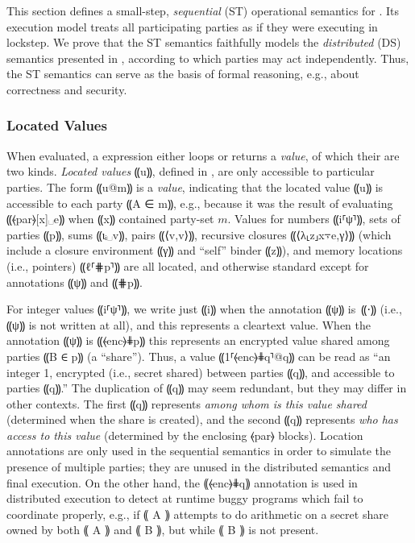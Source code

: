 This section defines a small-step, \emph{sequential} (ST)
operational semantics for \mpc. Its execution model treats all
participating parties as if they were executing in lockstep.
We prove that the ST semantics faithfully models the \emph{distributed} (DS)
semantics presented in , according to which parties may act
independently. Thus, the ST semantics can serve as the basis of \mpc formal reasoning,
e.g., about correctness and security.


\subsubsection{Located Values}
\label{subsubsec:mpc-design-seq-val}

When evaluated, a \mpc expression either loops or returns a \emph{value},
of which their are two kinds. \emph{Located values} ⸨u⸩, defined in
, are only accessible to particular parties. The form
⸨u@m⸩ is a \emph{value}, indicating that the located value ⸨u⸩ is
accessible to each party ⸨A ∈ m⸩, e.g., because it was the result of
evaluating ⸨⦑par⦒[x]␣e⸩ when ⸨x⸩ contained party-set $m$. Values for numbers ⸨i⸢ψ⸣⸩, sets of parties
⸨p⸩, sums ⸨ιᵢ␣v⸩, pairs ⸨⟨v,v⟩⸩, recursive closures ⸨⟨λ⸤z⸥x⍪e,γ⟩⸩ (which include
a closure environment ⸨γ⸩ and “self” binder ⸨z⸩), and memory locations (i.e.,
pointers) ⸨ℓ⸢⋕p⸣⸩ are all located, and otherwise standard except for annotations
⸨ψ⸩ and ⸨⋕p⸩.

For integer values ⸨i⸢ψ⸣⸩, we write just ⸨i⸩ when the annotation ⸨ψ⸩ is~⸨⋅⸩
(i.e., ⸨ψ⸩ is not written at all), and this represents a cleartext value. When
the annotation ⸨ψ⸩ is ⸨⦑enc⦒⋕p⸩ this represents an encrypted value shared among
parties ⸨B ∈ p⸩ (a ``share''). Thus, a value ⸨1⸢⦑enc⦒⋕q⸣@q⸩ can be read as “an
integer 1, encrypted (i.e., secret shared) between parties ⸨q⸩, and accessible to parties
⸨q⸩.” The duplication of ⸨q⸩ may seem redundant, but they may differ
in other contexts. The first ⸨q⸩ represents \emph{among whom is this value shared}
(determined when the share is created), and the second ⸨q⸩ represents
\emph{who has access to this value} (determined by the enclosing ⦑par⦒ blocks).
Location annotations are only used in the sequential semantics in order to
simulate the presence of multiple parties; they are unused in the distributed
semantics and final execution. On the other hand, the ⸨⦑enc⦒⋕q⸩ annotation is
used in distributed execution to detect at runtime buggy programs which fail to
coordinate properly, e.g., if ⸨ A ⸩ attempts to do arithmetic on a secret share
owned by both ⸨ A ⸩ and ⸨ B ⸩, but while ⸨ B ⸩ is not present.

